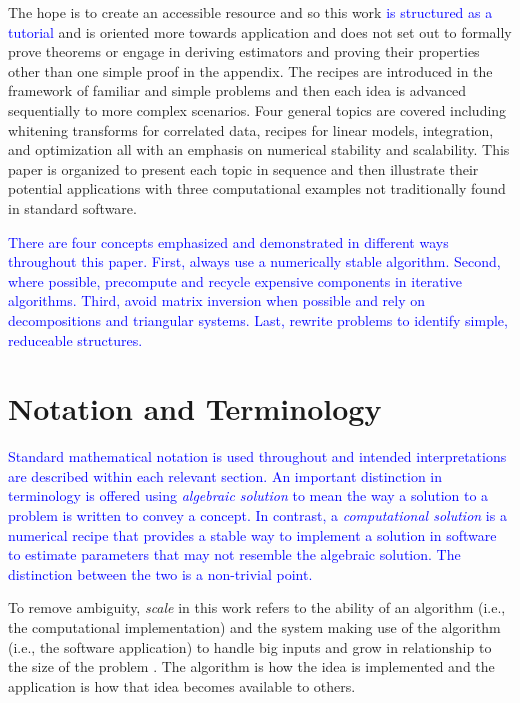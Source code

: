 \documentclass[12pt]{article}
\begin{document}
The hope is to create an accessible resource and so this work \textcolor{blue}{is structured as a tutorial} and is oriented more towards application and does not set out to formally prove theorems or engage in deriving estimators and proving their properties other than one simple proof in the appendix. The recipes are introduced in the framework of familiar and simple problems and then each idea is advanced sequentially to more complex scenarios. Four general topics are covered including whitening transforms for correlated data, recipes for linear models, integration, and optimization all with an emphasis on numerical stability and scalability. This paper is organized to present each topic in sequence and then illustrate their potential applications with three computational examples not traditionally found in standard software. 

\textcolor{blue}{There are four concepts emphasized and demonstrated in different ways throughout this paper. First, always use a numerically stable algorithm. Second, where possible, precompute and recycle expensive components in iterative algorithms. Third, avoid matrix inversion when possible and rely on decompositions and triangular systems. Last, rewrite problems to identify simple, reduceable structures.}

\section*{Notation and Terminology} 

\textcolor{blue}{Standard mathematical notation is used throughout and intended interpretations are described within each relevant section. An important distinction in terminology is offered using \textit{algebraic solution} to mean the way a solution to a problem is written to convey a concept. In contrast, a \textit{computational solution} is a numerical recipe that provides a stable way to implement a solution in software to estimate parameters that may not resemble the algebraic solution. The distinction between the two is a non-trivial point.}                           

To remove ambiguity, \textit{scale} in this work refers to the ability of an algorithm (i.e., the computational implementation) and the system making use of the algorithm (i.e., the software application) to handle big inputs and grow in relationship to the size of the problem \cite{teng}. The algorithm is how the idea is implemented and the application is how that idea becomes available to others.
\end{document}
